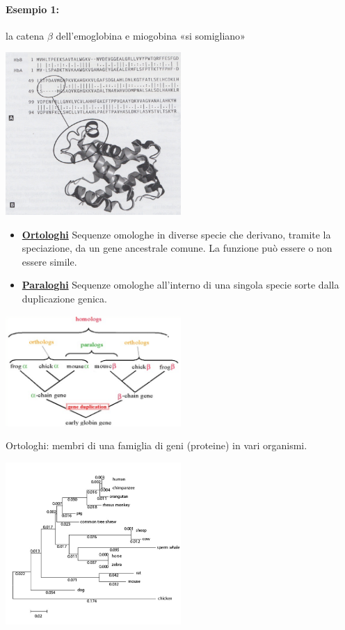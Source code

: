 \documentclass{article}
\begin{document}
\paragraph{Esempio 1:} la catena $\beta$ dell'emoglobina e miogobina «si somigliano» 
\begin{center}
    \includegraphics[width=0.5\textwidth]{figures/globine.png}
\end{center}
\begin{itemize}
    \item \underline{\textbf{Ortologhi}}
        \subitem Sequenze omologhe in diverse specie che derivano,
        tramite la speciazione, da un gene ancestrale
        comune. La funzione può essere o non essere
        simile.
    \item \underline{\textbf{Paraloghi}}
        \subitem Sequenze omologhe all'interno di una singola specie
        sorte dalla duplicazione genica.
\end{itemize}
\begin{center}
    \includegraphics[width=0.5\textwidth]{figures/ortpar.png}
\end{center}
\newpage
Ortologhi: membri di una famiglia di geni (proteine) in vari organismi.
\begin{center}
    \includegraphics[width=0.5\textwidth]{figures/ortpar2.png}
\end{center}
\end{document}
